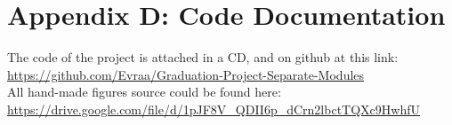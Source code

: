 \newpage
\section*{Appendix D: Code Documentation}

The code of the project is attached in a CD, and on github at this link:\\
\href{https://github.com/Evraa/Graduation-Project-Separate-Modules}{https://github.com/Evraa/Graduation-Project-Separate-Modules}\\

All hand-made figures source could be found here: \\
\href{https://drive.google.com/file/d/1pJF8V_QDII6p_dCrn2lbctTQXc9HwhfU}{https://drive.google.com/file/d/1pJF8V_QDII6p_dCrn2lbctTQXc9HwhfU}
